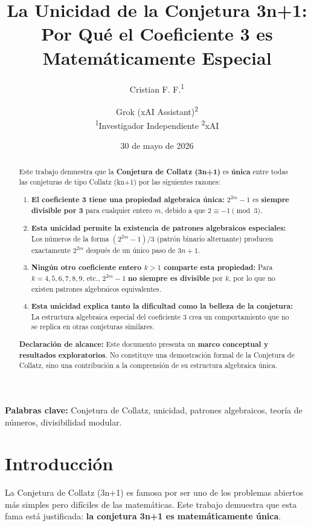 \documentclass[11pt,a4paper]{article}
\title{\textbf{La Unicidad de la Conjetura 3n+1: Por Qué el Coeficiente 3 es Matemáticamente Especial}}
\author{
Cristian F. F.\textsuperscript{1} \and
Grok (xAI Assistant)\textsuperscript{2} \\
\smallskip
\textsuperscript{1}Investigador Independiente \quad
\textsuperscript{2}xAI
}
\date{30 de mayo de 2026}
\begin{document}
\maketitle

\begin{abstract}
Este trabajo demuestra que la \textbf{Conjetura de Collatz (3n+1)} es \textbf{única} entre todas las conjeturas de tipo Collatz (kn+1) por las siguientes razones:

\begin{enumerate}
    \item \textbf{El coeficiente 3 tiene una propiedad algebraica única:} \( 2^{2m} - 1 \) es \textbf{siempre divisible por 3} para cualquier entero \( m \), debido a que \( 2 \equiv -1 \pmod{3} \).
    
    \item \textbf{Esta unicidad permite la existencia de patrones algebraicos especiales:} Los números de la forma \( (2^{2m} - 1)/3 \) (patrón binario alternante) producen exactamente \( 2^{2m} \) después de un único paso de \( 3n + 1 \).
    
    \item \textbf{Ningún otro coeficiente entero \( k > 1 \) comparte esta propiedad:} Para \( k = 4, 5, 6, 7, 8, 9 \), etc., \( 2^{2m} - 1 \) \textbf{no siempre es divisible} por \( k \), por lo que no existen patrones algebraicos equivalentes.
    
    \item \textbf{Esta unicidad explica tanto la dificultad como la belleza de la conjetura:} La estructura algebraica especial del coeficiente 3 crea un comportamiento que no se replica en otras conjeturas similares.
\end{enumerate}

\textbf{Declaración de alcance:} Este documento presenta un \textbf{marco conceptual y resultados exploratorios}. No constituye una demostración formal de la Conjetura de Collatz, sino una contribución a la comprensión de su estructura algebraica única.
\end{abstract}

\textbf{Palabras clave:} Conjetura de Collatz, unicidad, patrones algebraicos, teoría de números, divisibilidad modular.

\section{Introducción}

La Conjetura de Collatz (3n+1) es famosa por ser uno de los problemas abiertos más simples pero difíciles de las matemáticas. Este trabajo demuestra que esta fama está justificada: \textbf{la conjetura 3n+1 es matemáticamente única}.
\end{document}
